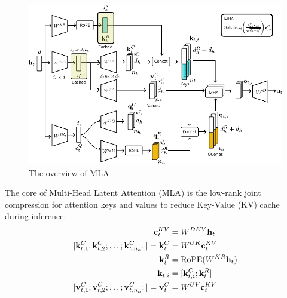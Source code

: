 \begin{figure}[h]
	\centering
	\includegraphics[scale=1.1]{./images/transformer/mla.pdf}
	\caption{The overview of MLA}
\end{figure}
The core of Multi-Head Latent Attention (MLA) is the low-rank joint compression for attention keys and values to reduce Key-Value (KV) cache during inference:
\begin{align*}
	\rvc_t^{KV} &= W^{DKV}\rvh_t\\
	[\rvk_{t,1}^C; \rvk_{t,2}^C; \dots ;\rvk_{t,n_h}^C;] = \rvk_t^{C} &= W^{UK}\rvc_t^{KV}\\
	\rvk_t^{R} &= \text{RoPE}(W^{KR}\rvh_t)\\
	\rvk_{t,i} &= [\rvk_{t,i}^C;\rvk_t^{R}]\\
	[\rvv_{t,1}^C; \rvv_{t,2}^C; \dots ;\rvv_{t,n_h}^C;] = \rvv_t^{C} &= W^{UV}\rvc_t^{KV}
\end{align*}
